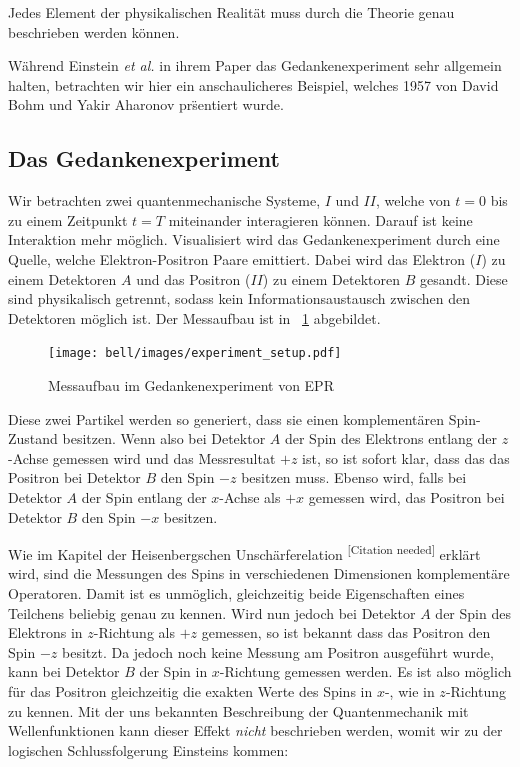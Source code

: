 \begin{refsection}
\begin{definition}\label{def:Bell:Vollstaendigkeit}
    Jedes Element der physikalischen Realit\"at muss durch die Theorie
    genau beschrieben werden k\"onnen.
\end{definition}

Während Einstein \emph{et al.} in ihrem Paper das Gedankenexperiment sehr
allgemein halten, betrachten wir hier ein anschaulicheres Beispiel, welches
1957 von David Bohm und Yakir Aharonov \cite{Bell:Bohm1957} pr\"sentiert wurde.

\subsection{Das Gedankenexperiment\label{subsection:bell:epr:experiment}}
Wir betrachten zwei quantenmechanische Systeme, $I$ und $II$,
welche von $t=0$ bis zu einem Zeitpunkt $t=T$ miteinander 
interagieren k\"onnen. Darauf ist keine Interaktion mehr m\"oglich.
Visualisiert wird das Gedankenexperiment durch eine Quelle, welche
Elektron-Positron Paare emittiert. 
Dabei wird das Elektron ($I$) zu einem Detektoren $A$ und das 
Positron ($II$) zu einem Detektoren $B$ gesandt.
Diese sind physikalisch getrennt, sodass kein Informationsaustausch
zwischen den Detektoren m\"oglich ist.
Der Messaufbau ist in \figurename~\ref{fig:bell:EPR_Messaufbau} abgebildet.

\begin{figure}
    \centering
    \texttt{[image: bell/images/experiment\_setup.pdf]}
    \caption{Messaufbau im Gedankenexperiment von EPR}
    \label{fig:bell:EPR_Messaufbau}
\end{figure}

Diese zwei Partikel werden so generiert, dass sie einen komplement\"aren
Spin-Zustand besitzen. 
Wenn also bei Detektor $A$ der Spin des Elektrons entlang der $z$-Achse
gemessen wird und das Messresultat $+z$ ist, so ist sofort klar, dass
das das Positron bei Detektor $B$ den Spin $-z$ besitzen muss. 
Ebenso wird, falls bei Detektor $A$ der Spin entlang der $x$-Achse als $+x$
gemessen wird, das Positron bei Detektor $B$ den Spin $-x$ besitzen.

Wie im Kapitel der Heisenbergschen Unsch\"arferelation
\textsuperscript{[Citation needed]}
erkl\"art wird, sind die Messungen des Spins in verschiedenen Dimensionen 
komplement\"are Operatoren.
Damit ist es unm\"oglich, gleichzeitig beide Eigenschaften eines Teilchens
beliebig genau zu kennen.
Wird nun jedoch bei Detektor $A$ der Spin des Elektrons in $z$-Richtung 
als $+z$ gemessen, so ist bekannt dass das Positron den Spin $-z$ besitzt.
Da jedoch noch keine Messung am Positron ausgef\"uhrt wurde, kann bei
Detektor $B$ der Spin in $x$-Richtung gemessen werden.
Es ist also m\"oglich f\"ur das Positron gleichzeitig die exakten Werte 
des Spins in $x$-, wie in $z$-Richtung zu kennen. 
Mit der uns bekannten Beschreibung der Quantenmechanik mit Wellenfunktionen
kann dieser Effekt \emph{nicht} beschrieben werden, womit wir zu der
logischen Schlussfolgerung Einsteins kommen:


\end{refsection}
